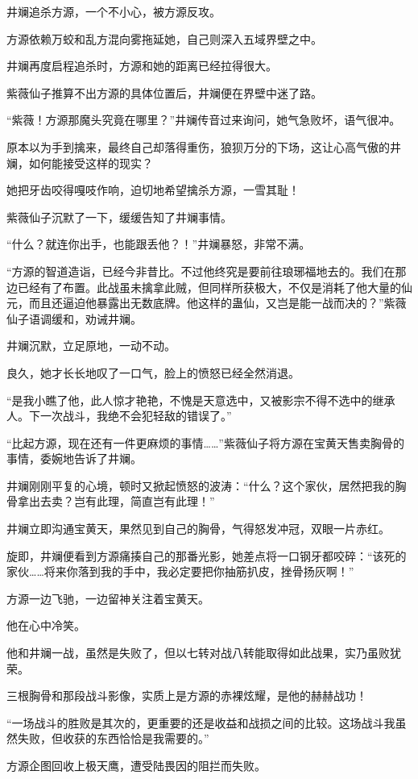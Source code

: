 \begin{this_body}
井斓追杀方源，一个不小心，被方源反攻。

方源依赖万蛟和乱方混向雾拖延她，自己则深入五域界壁之中。

井斓再度启程追杀时，方源和她的距离已经拉得很大。

紫薇仙子推算不出方源的具体位置后，井斓便在界壁中迷了路。

“紫薇！方源那魔头究竟在哪里？”井斓传音过来询问，她气急败坏，语气很冲。

原本以为手到擒来，最终自己却落得重伤，狼狈万分的下场，这让心高气傲的井斓，如何能接受这样的现实？

她把牙齿咬得嘎吱作响，迫切地希望擒杀方源，一雪其耻！

紫薇仙子沉默了一下，缓缓告知了井斓事情。

“什么？就连你出手，也能跟丢他？！”井斓暴怒，非常不满。

“方源的智道造诣，已经今非昔比。不过他终究是要前往琅琊福地去的。我们在那边已经有了布置。此战虽未擒拿此贼，但同样所获极大，不仅是消耗了他大量的仙元，而且还逼迫他暴露出无数底牌。他这样的蛊仙，又岂是能一战而决的？”紫薇仙子语调缓和，劝诫井斓。

井斓沉默，立足原地，一动不动。

良久，她才长长地叹了一口气，脸上的愤怒已经全然消退。

“是我小瞧了他，此人惊才艳艳，不愧是天意选中，又被影宗不得不选中的继承人。下一次战斗，我绝不会犯轻敌的错误了。”

“比起方源，现在还有一件更麻烦的事情……”紫薇仙子将方源在宝黄天售卖胸骨的事情，委婉地告诉了井斓。

井斓刚刚平复的心境，顿时又掀起愤怒的波涛：“什么？这个家伙，居然把我的胸骨拿出去卖？岂有此理，简直岂有此理！”

井斓立即沟通宝黄天，果然见到自己的胸骨，气得怒发冲冠，双眼一片赤红。

旋即，井斓便看到方源痛揍自己的那番光影，她差点将一口钢牙都咬碎：“该死的家伙……将来你落到我的手中，我必定要把你抽筋扒皮，挫骨扬灰啊！”

方源一边飞驰，一边留神关注着宝黄天。

他在心中冷笑。

他和井斓一战，虽然是失败了，但以七转对战八转能取得如此战果，实乃虽败犹荣。

三根胸骨和那段战斗影像，实质上是方源的赤裸炫耀，是他的赫赫战功！

“一场战斗的胜败是其次的，更重要的还是收益和战损之间的比较。这场战斗我虽然失败，但收获的东西恰恰是我需要的。”

方源企图回收上极天鹰，遭受陆畏因的阻拦而失败。


\end{this_body}

